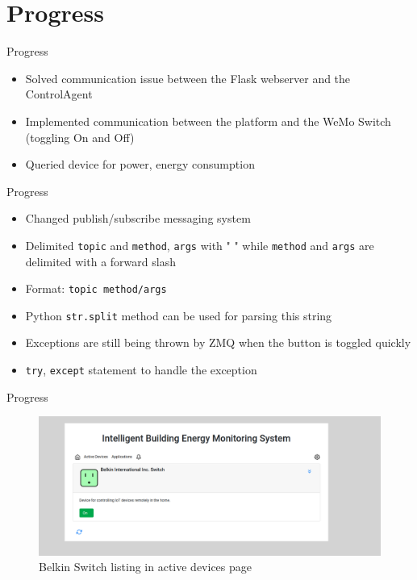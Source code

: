 \documentclass{beamer}
\begin{document}
\section{Progress}
\begin{frame}{Progress}{}
	\begin{itemize}
		\item Solved communication issue between the Flask webserver and the ControlAgent
		\item Implemented communication between the platform and the WeMo Switch (toggling On and Off)
		\item Queried device for power, energy consumption
	\end{itemize}
\end{frame}

\begin{frame}{Progress}{}
	\begin{itemize}
		\item Changed publish/subscribe messaging system 
		\item Delimited \texttt{topic} and \texttt{method}, \texttt{args} with " " while \texttt{method} and \texttt{args} are delimited with a forward slash
		\item Format: \texttt{topic method/args}
		\item Python \texttt{str.split} method can be used for parsing this string
		\item Exceptions are still being thrown by ZMQ when the button is toggled quickly
		\item \texttt{try}, \texttt{except} statement to handle the exception
	\end{itemize}
\end{frame}

\begin{frame}{Progress}{}
	\begin{figure}
		\centering
		\includegraphics[scale=0.2]{../figs/img/activeDevices2020-07-23.png}
		\caption{Belkin Switch listing in active devices page}
	\end{figure}
\end{frame}
\end{document}
